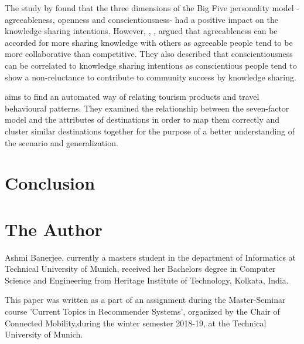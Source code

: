 




The study by \cite{cabrera2006determinants} found that the three dimensions of the Big Five personality model \cite{goldberg1990alternative} - agreeableness, openness and conscientiousness- had a positive impact on the knowledge sharing intentions. However,  \cite{matzler2011personality},  \cite{barrick1991big}, \cite{liao2004multilevel} argued that agreeableness can be accorded for more sharing knowledge with others as agreeable people tend to be more collaborative than competitive. They also described that conscientiousness can be correlated to knowledge sharing intentions as conscientious people tend to show a non-reluctance to contribute to community success by knowledge sharing.

\cite{sertkan2018mapping} aims to find an automated way of relating tourism products and travel behavioural patterns. They examined the relationship between the seven-factor model\cite{neidhardt2014eliciting}\cite{neidhardt2015picture}   and the attributes of destinations in order to map them correctly and cluster similar destinations together for the purpose of a better understanding of the scenario and generalization.


  
\section{Conclusion}

\appendix
\section{The Author}
Ashmi Banerjee, currently a masters student in the department of Informatics at Technical University of Munich, received her Bachelor\textquotesingle s degree in Computer Science and Engineering from Heritage Institute of Technology, Kolkata, India.

This paper was written as a part of an assignment during the Master-Seminar course 'Current Topics in Recommender Systems', organized by the Chair of
Connected Mobility,during the winter semester 2018-19, at the Technical University of Munich.

